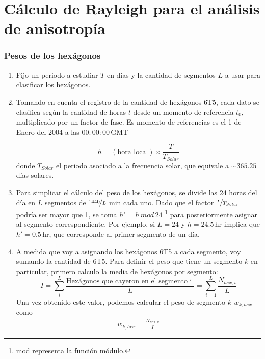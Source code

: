 \section{Cálculo de Rayleigh para el análisis de anisotropía}

  \subsubsection{Pesos de los hexágonos} \label{peso_hexagonos}


      \begin{enumerate}
        \item Fijo un periodo a estudiar $T$ en días y la cantidad de segmentos $L$ a usar para clasificar los hexágonos.
        \item Tomando en cuenta el registro de la cantidad de hexágonos 6T5, cada dato se clasifica según la cantidad de horas $t$ desde un momento de referencia $t_0$, multiplicado por un factor de fase. Es momento de referencias es el 1 de Enero del 2004 a las $00:00:00\,$GMT

         \begin{equation*}
          h = (\text{hora local})\times \frac{T}{T_{Solar}}
        \end{equation*}
        donde $T_{Solar}$ el periodo asociado a la frecuencia solar, que equivale a $\sim 365.25$  días solares. 
        \item Para simplicar el cálculo del peso de los hexágonos, se divide las 24 horas del día en $L$ segmentos de $\nicefrac{1440}{L}$ min cada uno. Dado que el factor $\nicefrac{T}{T_{Solar}}$ podría ser mayor que 1, se toma $h' = h\, mod \,24$ \footnote{mod representa la función módulo.} para posteriormente asignar al segmento correspondiente. Por ejemplo, si $L=24$ y  $h=24.5\,$hr implica que $h'= 0.5\,$hr, que corresponde al primer  segmento de un día.
       \item A medida que voy a asignando los hexágonos 6T5 a cada segmento, voy sumando la cantidad de 6T5. Para definir el peso que tiene un segmento $k$ en particular, primero calculo la media de hexágonos por segmento:
       \begin{equation}
         I = \sum^{L}_i \frac{\text{Hexágonos que cayeron en el segmento  i }}{L} = \sum^{L}_{i=1} \frac{N_{hex, i}}{L}
       \end{equation}
       Una vez obtenido este valor, podemos calcular el peso de segmento $k$  $w_{k,hex}$  como
        \begin{align}
         w_{k,hex}= \frac{N_{hex, k}}{I}
         \end{align} 
      \end{enumerate}

